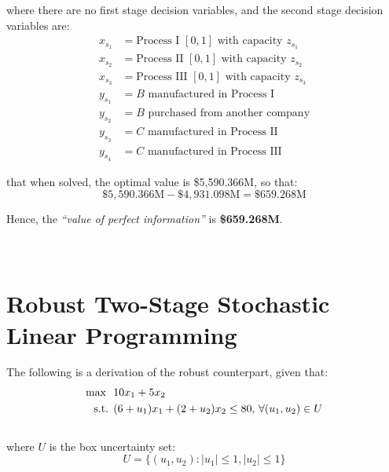 \documentclass{article}
\begin{document}
where there are no first stage decision variables, and the second stage decision variables are:
\begin{equation}
\begin{split}
    x_s_1 & = \text{Process I } [0,1] \text{ with capacity } z_s_1\\
    x_s_2 & = \text{Process II } [0,1] \text{ with capacity } z_s_2\\
    x_s_3 & = \text{Process III } [0,1] \text{ with capacity } z_s_3\\
    y_s_1 & = B \text{ manufactured in Process I}\\
    y_s_2 & = B \text{ purchased from another company}\\
    y_s_3 & = C \text{ manufactured in Process II}\\
    y_s_4 & = C \text{ manufactured in Process III}
\end{split}
\end{equation}

that when solved, the optimal value is \$5,590.366M, so that:
\begin{equation}
    \$5,590.366 \text{M} - \$4,931.098 \text{M} = \$659.268\text{M}
\end{equation}

Hence, the \textit{``value of perfect information''} is \textbf{\$659.268M}.\\
\\~\\

\section*{Robust Two-Stage Stochastic Linear Programming}

The following is a derivation of the robust counterpart, given that:
\begin{equation}
\begin{split}
    \text{max \space} 
    & 10x_1 + 5x_2\\
    \text{s.t.\space}
    & \space (6 + u_1) x_1 + (2 + u_2) x_2 \leq 80, \, \forall (u_1, u_2) \in U
\end{split}
\end{equation}\\

where $U$ is the box uncertainty set:
\begin{equation}
    U = \{(u_1, u_2): |u_1| \leq 1, |u_2| \leq 1\}
\end{equation}
\end{document}
